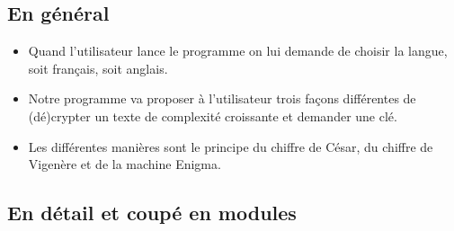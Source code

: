 \documentclass[a4paper,12pt,abstracton,titlepage]{scrartcl}
\begin{document}
\subsection{En général}
\begin{itemize}
\item Quand l’utilisateur lance le programme on lui demande de choisir la langue, soit français, soit anglais.
\item Notre programme va proposer à l’utilisateur trois façons différentes de (dé)crypter un texte de complexité croissante et demander une clé.
\item Les différentes manières sont le principe du chiffre de César, du chiffre de Vigenère et de la machine Enigma.
\end{itemize}

\newpage
\subsection{En détail et coupé en modules}
\end{document}
